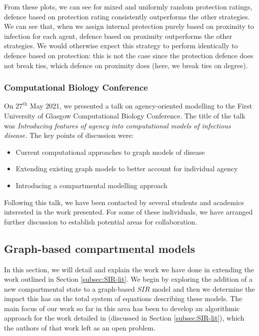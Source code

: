 \documentclass[../report.tex]{subfiles}
\begin{document}
From these plots, we can see for mixed and uniformly random protection ratings, defence based on protection rating consistently outperforms the other strategies. We can see that, when we assign internal protection purely based on proximity to infection for each agent, defence based on proximity outperforms the other strategies. We would otherwise expect this strategy to perform identically to defence based on protection: this is not the case since the protection defence does not break ties, which defence on proximity does (here, we break ties on degree).

\subsubsection{Computational Biology Conference}

On $27^{\text{th}}$ May 2021, we presented a talk on agency-oriented modelling to the First University of Glasgow Computational Biology Conference. The title of the talk was {\it Introducing features of agency into computational models of infectious disease.}
The key points of discussion were:
\begin{itemize}
\item Current computational approaches to graph models of disease
\item Extending existing graph models to better account for individual agency
\item Introducing a compartmental modelling approach
\end{itemize} 

Following this talk, we have been contacted by several students and academics interested in the work presented. For some of these individuals, we have arranged further discussion to establish potential areas for collaboration.


\subsection{Graph-based compartmental models}

In this section, we will detail and explain the work we have done in extending the work outlined in Section \ref{subsec:SIR-lit}. We begin by exploring the addition of a new compartmental state to a graph-based $SIR$ model and then we determine the impact this has on the total system of equations describing these models. The main focus of our work so far in this area has been to develop an algorithmic approach for the work detailed in \cite{kiss_2014} (discussed in Section \ref{subsec:SIR-lit}), which the authors of that work left as an open problem.
\end{document}
